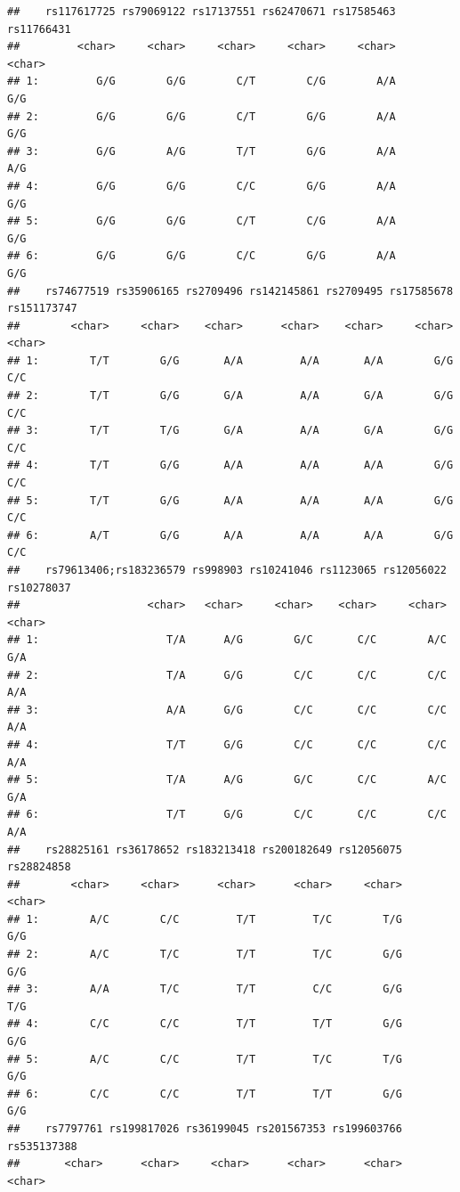 \documentclass[
]{article}
\begin{document}
\begin{verbatim}
##    rs117617725 rs79069122 rs17137551 rs62470671 rs17585463 rs11766431
##         <char>     <char>     <char>     <char>     <char>     <char>
## 1:         G/G        G/G        C/T        C/G        A/A        G/G
## 2:         G/G        G/G        C/T        G/G        A/A        G/G
## 3:         G/G        A/G        T/T        G/G        A/A        A/G
## 4:         G/G        G/G        C/C        G/G        A/A        G/G
## 5:         G/G        G/G        C/T        C/G        A/A        G/G
## 6:         G/G        G/G        C/C        G/G        A/A        G/G
##    rs74677519 rs35906165 rs2709496 rs142145861 rs2709495 rs17585678 rs151173747
##        <char>     <char>    <char>      <char>    <char>     <char>      <char>
## 1:        T/T        G/G       A/A         A/A       A/A        G/G         C/C
## 2:        T/T        G/G       G/A         A/A       G/A        G/G         C/C
## 3:        T/T        T/G       G/A         A/A       G/A        G/G         C/C
## 4:        T/T        G/G       A/A         A/A       A/A        G/G         C/C
## 5:        T/T        G/G       A/A         A/A       A/A        G/G         C/C
## 6:        A/T        G/G       A/A         A/A       A/A        G/G         C/C
##    rs79613406;rs183236579 rs998903 rs10241046 rs1123065 rs12056022 rs10278037
##                    <char>   <char>     <char>    <char>     <char>     <char>
## 1:                    T/A      A/G        G/C       C/C        A/C        G/A
## 2:                    T/A      G/G        C/C       C/C        C/C        A/A
## 3:                    A/A      G/G        C/C       C/C        C/C        A/A
## 4:                    T/T      G/G        C/C       C/C        C/C        A/A
## 5:                    T/A      A/G        G/C       C/C        A/C        G/A
## 6:                    T/T      G/G        C/C       C/C        C/C        A/A
##    rs28825161 rs36178652 rs183213418 rs200182649 rs12056075 rs28824858
##        <char>     <char>      <char>      <char>     <char>     <char>
## 1:        A/C        C/C         T/T         T/C        T/G        G/G
## 2:        A/C        T/C         T/T         T/C        G/G        G/G
## 3:        A/A        T/C         T/T         C/C        G/G        T/G
## 4:        C/C        C/C         T/T         T/T        G/G        G/G
## 5:        A/C        C/C         T/T         T/C        T/G        G/G
## 6:        C/C        C/C         T/T         T/T        G/G        G/G
##    rs7797761 rs199817026 rs36199045 rs201567353 rs199603766 rs535137388
##       <char>      <char>     <char>      <char>      <char>      <char>

\end{verbatim}
\end{document}
